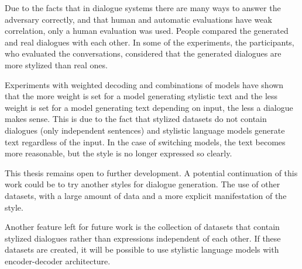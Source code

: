 Due to the facts that in dialogue systems there are many ways to answer the adversary correctly, and that human and automatic evaluations have weak
correlation, only a human evaluation was used. People compared the generated and real dialogues with each other. In some of the experiments, the participants, who evaluated the conversations, considered that the generated dialogues are more stylized than real ones.

Experiments with weighted decoding and combinations of models have shown that the more weight is set for a model generating stylistic text and the less weight is set for a model generating text depending on input, the less a dialogue makes sense. This is due to the fact that stylized datasets do not contain dialogues (only independent sentences) and stylistic language models generate text regardless of the input. In the case of switching models, the text becomes more reasonable, but the style is no longer expressed so clearly.

This thesis remains open to further development. A potential continuation of this work could be to try another styles for dialogue generation. The use of other datasets, with a large amount of data and a more explicit manifestation of the style. 

Another feature left for future work is the collection of datasets that contain stylized dialogues rather than expressions independent of each other. If these datasets are created, it will be possible to use stylistic language models with encoder-decoder architecture.


